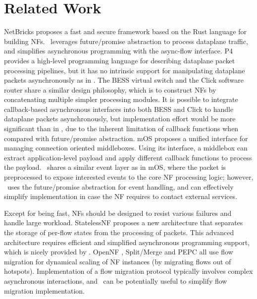 \section{Related Work}

NetBricks proposes a fast and secure framework based on the Rust \cite{199352} language for building NFs. %
\netstar~leverages future/promise abstraction to process dataplane traffic, and simplifies asynchronous programming with the async-flow interface.
P4 \cite{bosshart2014p4} provides a high-level programming language for describing dataplane packet processing pipelines, but it has no intrinsic support for manipulating dataplane packets asynchronously as in \netstar. The BESS virtual switch \cite{bess} and the Click software router \cite{kohler2000click} share a similar design philosophy, which is to construct NFs by concatenating multiple simpler processing modules. It is possible to integrate callback-based asynchronous interfaces into both BESS and Click to handle dataplane packets asynchronously, but implementation effort would be more significant than in \netstar, due to the inherent limitation of callback functions when compared with future/promise abstraction.
mOS \cite{201546} proposes a unified interface for managing connection oriented middleboxes. Using its interface, a middlebox can extract application-level payload and apply different callback functions to process the payload. \netstar~shares a similar event layer as in mOS, where the packet is preprocessed to expose interested events to the core NF processing logic; however, \netstar~uses the future/promise abstraction for event handling, and can effectively simplify implementation in case the NF requires to contact external services.

Except for being fast, NFs should be designed to resist various failures and handle large workload. %
StatelessNF \cite{201545} proposes a new architecture that separates the storage of per-flow states from the processing of packets. This advanced architecture requires efficient and simplified asynchronous programming support, which is nicely provided by \netstar. OpenNF \cite{gember2015opennf}, Split/Merge \cite{rajagopalan2013split} and PEPC \cite{Qazi:2017:HPP:3098822.3098848} all use flow migration for dynamical scaling of NF instances (by migrating flows out of hotspots). Implementation of a flow migration protocol typically involves complex asynchronous interactions, and \netstar~can be potentially useful to simplify flow migration implementation.

